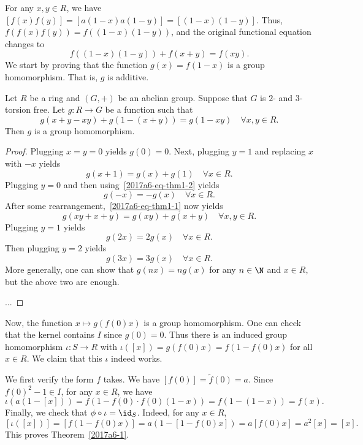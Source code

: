 For any $x, y \in R$, we have $[f(x) f(y)] = [a (1 - x) a (1 - y)] = [(1 - x)(1 - y)]$.
Thus, $f(f(x) f(y)) = f((1 - x)(1 - y))$, and the original functional equation changes to
\[ f((1 - x) (1 - y)) + f(x + y) = f(xy). \]
We start by proving that the function $g(x) = f(1 - x)$ is a group homomorphism.
That is, $g$ is additive.

\begin{lemma}\label{2017a6-side-FE-solution}
Let $R$ be a ring and $(G, +)$ be an abelian group.
Suppose that $G$ is $2$- and $3$-torsion free.
Let $g : R \to G$ be a function such that
\[ g(x + y - xy) + g(1 - (x + y)) = g(1 - xy) \quad \forall x, y \in R. \tag{1.1}\label{2017a6-eq-thm1-1} \]
Then $g$ is a group homomorphism.
\end{lemma}
\begin{proof}
Plugging $x = y = 0$ yields $g(0) = 0$.
Next, plugging $y = 1$ and replacing $x$ with $-x$ yields
\[ g(x + 1) = g(x) + g(1) \quad \forall x \in R. \tag{1.2}\label{2017a6-eq-thm1-2} \]
Plugging $y = 0$ and then using~\eqref{2017a6-eq-thm1-2} yields
\[ g(-x) = -g(x) \quad \forall x \in R. \tag{1.3}\label{2017a6-eq-thm1-3} \]
After some rearrangement,~\eqref{2017a6-eq-thm1-1} now yields
\[ g(xy + x + y) = g(xy) + g(x + y) \quad \forall x, y \in R. \tag{1.4}\label{2017a6-eq-thm1-4} \]
Plugging $y = 1$ yields
\[ g(2x) = 2 g(x) \quad \forall x \in R. \tag{1.5}\label{2017a6-eq-thm1-5} \]
Then plugging $y = 2$ yields
\[ g(3x) = 3 g(x) \quad \forall x \in R. \tag{1.6}\label{2017a6-eq-thm1-6} \]
More generally, one can show that $g(nx) = n g(x)$ for any $n \in \N$ and $x \in R$, but the above two are enough.

... %
\end{proof}

Now, the function $x \mapsto g(f(0) x)$ is a group homomorphism.
One can check that the kernel contains $I$ since $g(0) = 0$.
Thus there is an induced group homomorphism $\iota : S \to R$ with $\iota([x]) = g(f(0) x) = f(1 - f(0) x)$ for all $x \in R$.
We claim that this $\iota$ indeed works.

We first verify the form $f$ takes.
We have $[f(0)] = \tilde{f}(0) = a$.
Since $f(0)^2 - 1 \in I$, for any $x \in R$, we have
\[ \iota(a(1 - [x])) = f(1 - f(0) \cdot f(0) (1 - x)) = f(1 - (1 - x)) = f(x). \]
Finally, we check that $\phi \circ \iota = \id_S$.
Indeed, for any $x \in R$,
\[ [\iota([x])] = [f(1 - f(0) x)] = a(1 - [1 - f(0) x]) = a [f(0) x] = a^2 [x] = [x]. \]
This proves Theorem~\ref{2017a6-1}.



